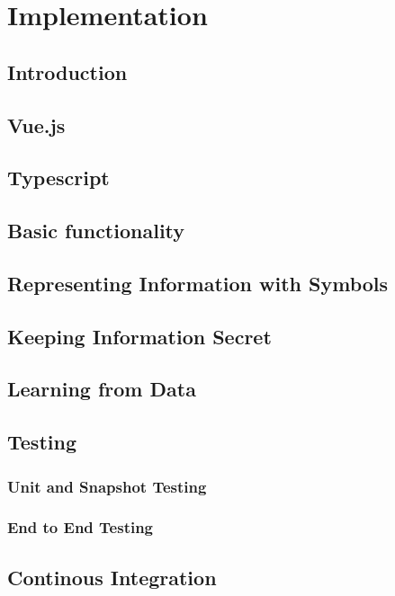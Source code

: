 \chapter{Implementation}

\section{Introduction}

\section{Vue.js}

\section{Typescript}

\section{Basic functionality}


\section{Representing Information with Symbols}


\section{Keeping Information Secret}


\section{Learning from Data}


\section{Testing}

\subsection{Unit and Snapshot Testing}


\subsection{End to End Testing}


\section{Continous Integration}

